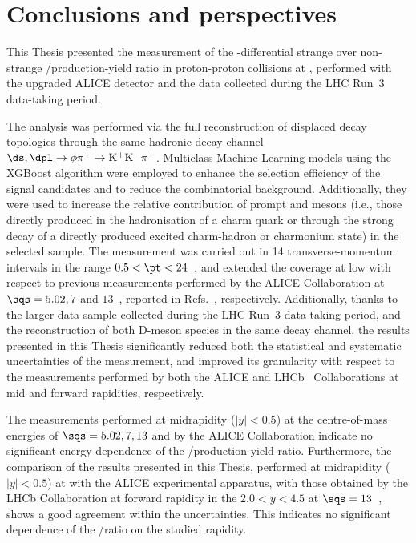 \chapter{Conclusions and perspectives}\label{ch:conclusions}

This Thesis presented the measurement of the \pt-differential strange over non-strange \ds/\dpl production-yield ratio in proton-proton collisions at \thirteen, performed with the upgraded ALICE detector and the data collected during the LHC Run~3 data-taking period. 

The analysis was performed via the full reconstruction of displaced decay topologies through the same hadronic decay channel $\ds, \dpl \rightarrow \phi\pi^+\rightarrow\mathrm{K^+K^-\pi^+}$. Multiclass Machine Learning models using the XGBoost algorithm were employed to enhance the selection efficiency of the signal candidates and to reduce the combinatorial background. Additionally, they were used to increase the relative contribution of prompt \ds and \dpl mesons (i.e., those directly produced in the hadronisation of a charm quark or through the strong decay of a directly produced excited charm-hadron or charmonium state) in the selected sample. The measurement was carried out in 14 transverse-momentum intervals in the range $0.5<\pt<24$~\gevc, and extended the \pt coverage at low \pt with respect to previous measurements performed by the ALICE Collaboration at $\sqs = 5.02, 7$ and $13$~\tev, reported in Refs.~\cite{ALICE:2021mgk,ALICE:2017olh,ALICE:2023sgl}, respectively. Additionally, thanks to the larger data sample collected during the LHC Run~3 data-taking period, and the reconstruction of both D-meson species in the same decay channel, the results presented in this Thesis significantly reduced both the statistical and systematic uncertainties of the measurement, and improved its granularity with respect to the measurements performed by both the ALICE and LHCb~\cite{LHCb:2015swx} Collaborations at mid and forward rapidities, respectively.

The measurements performed at midrapidity ($\lvert y\rvert<0.5$) at the centre-of-mass energies of  $\sqs = 5.02, 7, 13$ and \thirteen by the ALICE Collaboration indicate no significant energy-dependence of the \ds/\dpl production-yield ratio. Furthermore, the comparison of the results presented in this Thesis, performed at midrapidity ($\lvert y\rvert<0.5$) at \thirteen with the ALICE experimental apparatus, with those obtained by the LHCb Collaboration at forward rapidity in the $2.0<y<4.5$ at $\sqs=13$~\tev, shows a good agreement within the uncertainties. This indicates no significant dependence of the \ds/\dpl ratio on the studied rapidity. 

